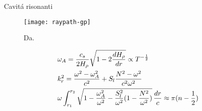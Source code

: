 \documentclass[10pt,xcolor={usenames},fleqn,mathserif,serif]{beamer}
\begin{document}
\begin{frame}{Cavit\'a risonanti}

\begin{figure}[!ht]
\centering
\texttt{[image: raypath-gp]}
\caption{Da\cite{gou91seismic}.}
\end{figure}
\begin{align*}
&\omega_A=\frac{c_s}{2\densityscale{}}\sqrt{1-2\TDy{r}{\densityscale{}}}\propto T\expy{-\frac{1}{2}}\\%
&k_r^2=\frac{\omega^2-\omega_A^2}{c^2}+S_l\frac{N^2-\omega^2}{c^2\omega^2}\\%
&\omega\int_{r_1}^{r_2}\sqrt{1-\frac{\omega_A^2}{\omega^2}-\frac{S_l^2}{\omega^2}(1-\frac{N^2}{\omega^2})}\,\frac{dr}{c}\approx\pi(n-\frac{1}{2})%
\end{align*}

\end{frame}
\end{document}
